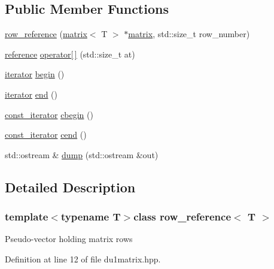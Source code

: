 \subsection*{Public Member Functions}
\begin{DoxyCompactItemize}
\item 
\hyperlink{classrow__reference_a7d9e01c0b7cfb9731084476fe460a6d2}{row\-\_\-reference} (\hyperlink{classmatrix}{matrix}$<$ T $>$ $\ast$\hyperlink{classmatrix}{matrix}, std\-::size\-\_\-t row\-\_\-number)
\item 
\hyperlink{classrow__reference_aa9bd9523fa30ad1336ad1327c011dde3}{reference} \hyperlink{classrow__reference_a9ef7e1a34a562836f33d6f31a27689d0}{operator\mbox{[}$\,$\mbox{]}} (std\-::size\-\_\-t at)
\item 
\hyperlink{classrow__reference_a82d976cea237ebb2ddb3be8bd810ffa8}{iterator} \hyperlink{classrow__reference_a16bf6d47a92d1f36c8592df5ac56de6c}{begin} ()
\item 
\hyperlink{classrow__reference_a82d976cea237ebb2ddb3be8bd810ffa8}{iterator} \hyperlink{classrow__reference_ab20130e98dade4845b0a3c1e93f91212}{end} ()
\item 
\hyperlink{classrow__reference_a3a005e2f998d46b3718fc09c79066b5e}{const\-\_\-iterator} \hyperlink{classrow__reference_afbf2b114f6e7545cb1cb08a83ebc6633}{cbegin} ()
\item 
\hyperlink{classrow__reference_a3a005e2f998d46b3718fc09c79066b5e}{const\-\_\-iterator} \hyperlink{classrow__reference_a3ca08789ae00816fcb27e709a322af65}{cend} ()
\item 
std\-::ostream \& \hyperlink{classrow__reference_a977ea31ded2954af475401ac1ac52a49}{dump} (std\-::ostream \&out)
\end{DoxyCompactItemize}


\subsection{Detailed Description}
\subsubsection*{template$<$typename T$>$class row\-\_\-reference$<$ T $>$}

Pseudo-\/vector holding matrix rows 

Definition at line 12 of file du1matrix.\-hpp.



